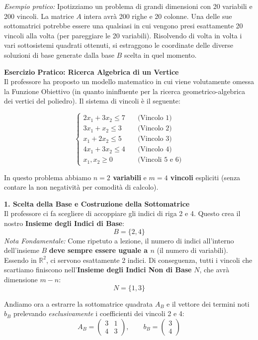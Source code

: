 \documentclass[12pt, a4paper]{article}
\begin{document}
	\textit{Esempio pratico:} Ipotizziamo un problema di grandi dimensioni con 20 variabili e 200 vincoli. La matrice $A$ intera avrà 200 righe e 20 colonne. Una delle sue sottomatrici potrebbe essere una qualsiasi in cui vengono presi esattamente 20 vincoli alla volta (per pareggiare le 20 variabili). Risolvendo di volta in volta i vari sottosistemi quadrati ottenuti, si estraggono le coordinate delle diverse soluzioni di base generate dalla base $B$ scelta in quel momento.
	
	\vspace{0.6cm}
	\textbf{Esercizio Pratico: Ricerca Algebrica di un Vertice}\\
	Il professore ha proposto un modello matematico in cui viene volutamente omessa la Funzione Obiettivo (in quanto ininfluente per la ricerca geometrico-algebrica dei vertici del poliedro). Il sistema di vincoli è il seguente:
	
	\[
	\begin{cases}
		2x_1 + 3x_2 \leq 7 \quad &\text{(Vincolo 1)} \\
		3x_1 + x_2 \leq 3 \quad &\text{(Vincolo 2)} \\
		x_1 + 2x_2 \leq 5 \quad &\text{(Vincolo 3)} \\
		4x_1 + 3x_2 \leq 4 \quad &\text{(Vincolo 4)} \\
		x_1, x_2 \geq 0 \quad &\text{(Vincoli 5 e 6)}
	\end{cases}
	\]
	
	In questo problema abbiamo \textbf{$n = 2$ variabili} e \textbf{$m = 4$ vincoli} espliciti (senza contare la non negatività per comodità di calcolo). 
	
	\vspace{0.3cm}
	\textbf{1. Scelta della Base e Costruzione della Sottomatrice}\\
	Il professore ci fa scegliere di accoppiare gli indici di riga 2 e 4. Questo crea il nostro \textbf{Insieme degli Indici di Base}:
	\[
	B = \{2, 4\}
	\]
	\textit{Nota Fondamentale:} Come ripetuto a lezione, il numero di indici all'interno dell'insieme $B$ \textbf{deve sempre essere uguale a $n$} (il numero di variabili). Essendo in $\mathbb{R}^2$, ci servono esattamente 2 indici.
	Di conseguenza, tutti i vincoli che scartiamo finiscono nell'\textbf{Insieme degli Indici Non di Base} $N$, che avrà dimensione $m-n$:
	\[
	N = \{1, 3\} 
	\]
	
	Andiamo ora a estrarre la sottomatrice quadrata $A_B$ e il vettore dei termini noti $b_B$ prelevando \textit{esclusivamente} i coefficienti dei vincoli 2 e 4:
	\[
	A_B = \begin{pmatrix} 3 & 1 \\ 4 & 3 \end{pmatrix}, \qquad b_B = \begin{pmatrix} 3 \\ 4 \end{pmatrix}
	\]
	
\end{document}
